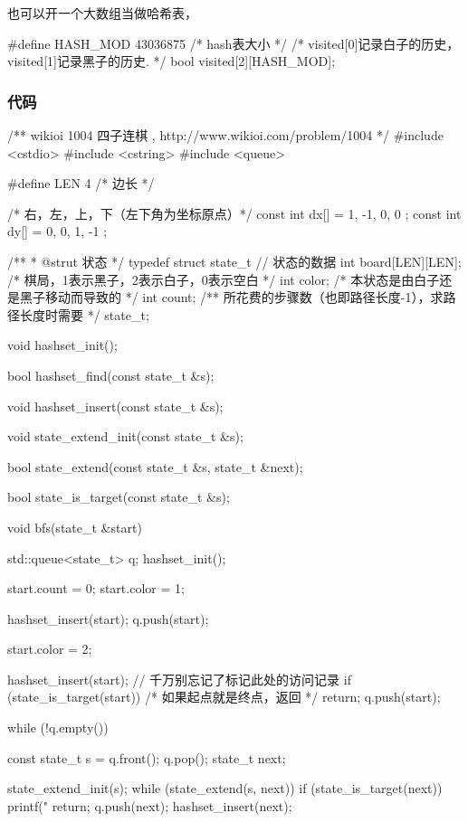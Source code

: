 也可以开一个大数组当做哈希表，
\begin{Code}
#define HASH_MOD 43036875 /* hash表大小 */
/* visited[0]记录白子的历史， visited[1]记录黑子的历史. */
bool visited[2][HASH_MOD];
\end{Code}

\subsubsection{代码}
\begin{Codex}[label=four_adjacent.cpp]
/** wikioi 1004 四子连棋  , http://www.wikioi.com/problem/1004 */
#include <cstdio>
#include <cstring>
#include <queue>

#define LEN 4   /* 边长 */

/* 右，左，上，下（左下角为坐标原点）*/
const int dx[] = { 1, -1, 0, 0 };
const int dy[] = { 0, 0, 1, -1 };


/**
 * @strut 状态
 */
typedef struct state_t {
    // 状态的数据
    int board[LEN][LEN]; /* 棋局，1表示黑子，2表示白子，0表示空白 */
    int color; /* 本状态是由白子还是黑子移动而导致的 */
    int count;  /** 所花费的步骤数（也即路径长度-1），求路径长度时需要 */
} state_t;

void hashset_init();

bool hashset_find(const state_t &s);

void hashset_insert(const state_t &s);

void state_extend_init(const state_t &s);

bool state_extend(const state_t &s, state_t &next);

bool state_is_target(const state_t &s);

void bfs(state_t &start) {
    std::queue<state_t> q;
    hashset_init();

    start.count = 0;
    start.color = 1;

    hashset_insert(start);
    q.push(start);

    start.color = 2;

    hashset_insert(start); // 千万别忘记了标记此处的访问记录
    if (state_is_target(start)) /* 如果起点就是终点，返回 */
        return;
    q.push(start);

    while (!q.empty()) {
        const state_t s = q.front(); q.pop();
        state_t next;

        state_extend_init(s);
        while (state_extend(s, next)) {
            if (state_is_target(next)) {
                printf("%
                return;
            }
            q.push(next);
            hashset_insert(next);
        }
    }
}


\end{Codex}

